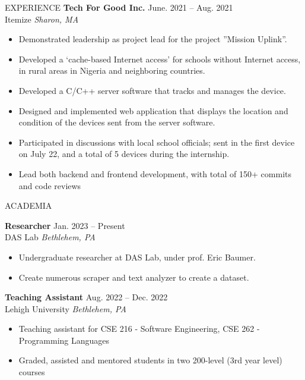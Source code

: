 \documentclass{resume}
\begin{document}
\begin{rSection}{EXPERIENCE}
  \textbf{Tech For Good Inc.} \hfill June. 2021 – Aug. 2021\\
  Itemize \hfill \textit{Sharon, MA}
    \begin{itemize}
       \itemsep -5pt {} 
           \item Demonstrated leadership as project lead for the project ”Mission Uplink”.
           \item Developed a `cache-based Internet access' for schools without Internet access, in rural areas in Nigeria and neighboring countries.
           \item Developed a C/C++ server software that tracks and manages the device.
           \item Designed and implemented web application that displays the location and condition of the devices sent from the server software.
           \item Participated in discussions with local school officials; sent in the first device on July 22, and a total of 5 devices during the internship.
           \item Lead both backend and frontend development, with total of 150+ commits and code reviews
    \end{itemize}


\end{rSection} 

\begin{rSection}{ACADEMIA}

    \textbf{Researcher} \hfill Jan. 2023 – Present\\
    DAS Lab \hfill \textit{Bethlehem, PA}
    \begin{itemize}
        \itemsep -5pt {} 
         \item Undergraduate researcher at DAS Lab, under prof. Eric Baumer.
         \item Create numerous scraper and text analyzer to create a dataset.
     \end{itemize}
    
      \textbf{Teaching Assistant} \hfill Aug. 2022 – Dec. 2022\\
      Lehigh University \hfill \textit{Bethlehem, PA}
        \begin{itemize}
           \itemsep -5pt {}
            \item Teaching assistant for CSE 216 - Software Engineering, CSE 262 - Programming Languages 
            \item Graded, assisted and mentored students in two 200-level (3rd year level) courses
        \end{itemize}
    
    
    \end{rSection} 
\end{document}
